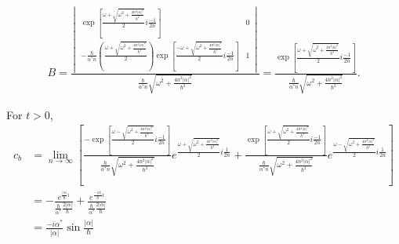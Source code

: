\begin{align*}
    B =
    \frac{\begin{vmatrix}
            \exp\left[
                    \frac{\omega + \sqrt{\omega^2 + \frac{4n^2|\alpha|^2}{\hbar^2}}}{2} i\frac{-1}{2n}
                    \right]                                    &
            0                                                                                                                                                                                                     \\
            -\frac{\hbar}{\alpha^* n }\left(\frac{\omega + \sqrt{\omega^2 + \frac{4n^2|\alpha|^2}{\hbar^2}}}{2} \right)\exp\left[
                                                                                                                               \frac{-\omega + \sqrt{\omega^2 + \frac{4n^2|\alpha|^2}{\hbar^2}}}{2} i\frac{-1}{2n}
                                                                                                                               \right] & 1
        \end{vmatrix}}
    {\frac{\hbar}{\alpha^* n}
        \sqrt{\omega^2 + \frac{4n^2|\alpha|^2}{\hbar^2}}} =
    \frac{\exp\left[
            \frac{\omega + \sqrt{\omega^2 + \frac{4n^2|\alpha|^2}{\hbar^2}}}{2} i\frac{-1}{2n}
            \right]   }{\frac{\hbar}{\alpha^* n}
        \sqrt{\omega^2 + \frac{4n^2|\alpha|^2}{\hbar^2}}}.
\end{align*}

For $t>0$,
\begin{align*}
    c_b & =
    \lim_{n\to\infty}\left[
                         \frac{-\exp\left[
                                 \frac{\omega - \sqrt{\omega^2 + \frac{4n^2|\alpha|^2}{\hbar^2}}}{2} i\frac{-1}{2n}
                                 \right]}
                         {\frac{\hbar}{\alpha^* n}
                             \sqrt{\omega^2 + \frac{4n^2|\alpha|^2}{\hbar^2}}}
                         e^{\frac{\omega+\sqrt{\omega^2 + \frac{4n^2|\alpha|^2}{\hbar^2}}}{2}i\frac{1}{2n}} +
                         \frac{\exp\left[
                                 \frac{\omega + \sqrt{\omega^2 + \frac{4n^2|\alpha|^2}{\hbar^2}}}{2} i\frac{-1}{2n}
                                 \right]   }{\frac{\hbar}{\alpha^* n}
                             \sqrt{\omega^2 + \frac{4n^2|\alpha|^2}{\hbar^2}}}
                         e^{\frac{\omega-\sqrt{\omega^2 + \frac{4n^2|\alpha|^2}{\hbar^2}}}{2}i\frac{1}{2n}}
                         \right] \\
        & =
    - \frac{e^{\frac{|\alpha|}{\hbar}i}}
      {\frac{\hbar}{\alpha ^*}\frac{2|\alpha|}{\hbar}}
    +
    \frac{e^{\frac{-|\alpha|}{\hbar}i}}
    {\frac{\hbar}{\alpha ^*}\frac{2|\alpha|}{\hbar}}
    \\
        & =\frac{-i\alpha^*}{|\alpha|}
    \sin \frac{|\alpha|}{\hbar}
\end{align*}

